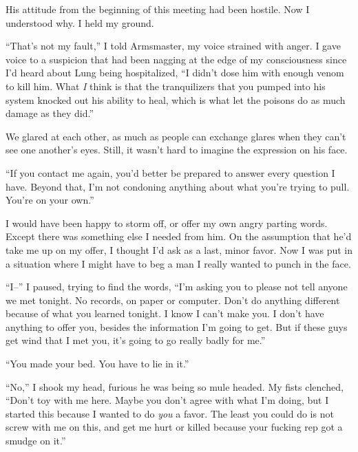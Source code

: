 His attitude from the beginning of this meeting had been hostile.  Now I understood why.  I held my ground.



``That's not my fault,'' I told Armsmaster, my voice strained with anger.  I gave voice to a suspicion that had been nagging at the edge of my consciousness since I'd heard about Lung being hospitalized, ``I didn't dose him with enough venom to kill him.  What \emph{I} think is that the tranquilizers that you pumped into his system knocked out his ability to heal, which is what let the poisons do as much damage as they did.''



We glared at each other, as much as people can exchange glares when they can't see one another's eyes.  Still, it wasn't hard to imagine the expression on his face.



``If you contact me again, you'd better be prepared to answer every question I have.  Beyond that, I'm not condoning anything about what you're trying to pull.  You're on your own.''



I would have been happy to storm off, or offer my own angry parting words.  Except there was something else I needed from him.  On the assumption that he'd take me up on my offer, I thought I'd ask as a last, minor favor.  Now I was put in a situation where I might have to beg a man I really wanted to punch in the face.



``I--'' I paused, trying to find the words, ``I'm asking you to please not tell anyone we met tonight.  No records, on paper or computer.  Don't do anything different because of what you learned tonight.  I know I can't make you.  I don't have anything to offer you, besides the information I'm going to get.  But if these guys get wind that I met you, it's going to go really badly for me.''



``You made your bed.  You have to lie in it.''



``No,'' I shook my head, furious he was being so mule headed.  My fists clenched, ``Don't toy with me here.  Maybe you don't agree with what I'm doing, but I started this because I wanted to do \emph{you} a favor.  The least you could do is not screw with me on this, and get me hurt or killed because your fucking rep got a smudge on it.''



